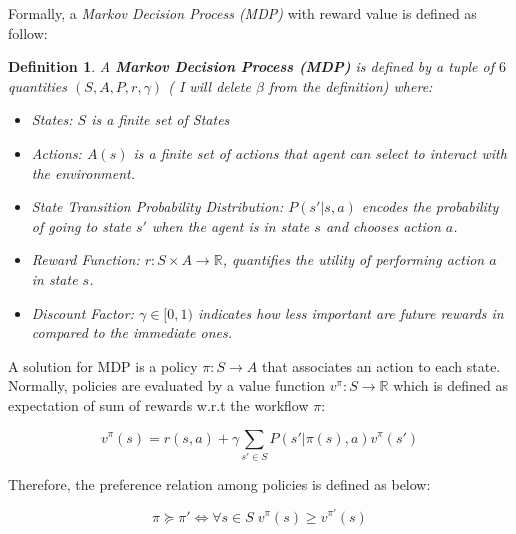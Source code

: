 \documentclass{sigchi}
\newtheorem{definition}{Definition}
\begin{document}
Formally, a \emph{Markov Decision Process (MDP)} with reward value is defined as follow:

\begin{definition}
A \textbf{Markov Decision Process (MDP)} \cite{Puterman:1994:MDP:528623} is defined by a tuple of $6$ quantities $(S, A, P, r, \gamma)$ ({\color{red} I will delete $\beta$ from the definition}) where:

\begin{itemize}
\item[-]States: $S$ is a finite set of States
\item[-] Actions: $A(s)$ is a finite set of actions that agent can select to interact with the environment.
\item[-] State Transition Probability Distribution: $P(s'| s,a)$ encodes the probability of going to state $s'$ when the agent is in state $s$ and chooses action $a$.
\item[-] Reward Function: $r : S \times A \longrightarrow \mathbb{R}$, quantifies the utility of performing action $a$ in state $s$.    
\item[-] Discount Factor: $\gamma \in [0,1)$ indicates how less important are future rewards in compared to the immediate ones. 
\end{itemize}

\end{definition}

A solution for MDP is a policy $\pi: S \longrightarrow A$ that associates an action to each state. Normally,  policies are evaluated by a value function $v^{\pi} : S \longrightarrow \mathbb{R}$ which is defined as expectation of sum of rewards w.r.t the workflow $\pi$: 

\begin{equation}\label{eq:value-func}
v^{\pi}(s) = r(s,a) + \gamma \sum_{s' \in S} P(s'|\pi(s),a) v^{\pi}(s') 
\end{equation}

Therefore, the preference relation among policies is defined as below:

\begin{equation}
\pi \succeq \pi' \Leftrightarrow \forall s \in S \; v^{\pi}(s) \geq v^{\pi'}(s)
\end{equation}
\end{document}
